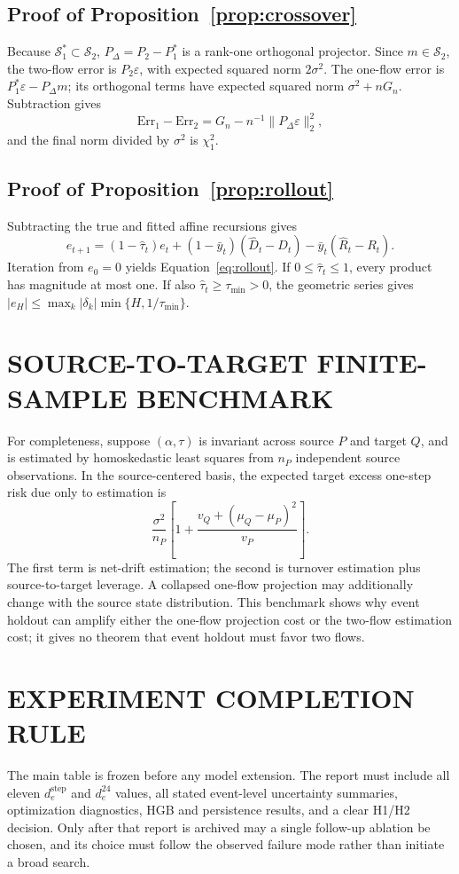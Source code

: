 \documentclass[twoside]{article}
\newcommand{\cS}{\mathcal{S}}
\theoremstyle{plain}
\theoremstyle{definition}
\theoremstyle{remark}
\begin{document}
\subsection{Proof of Proposition~\ref{prop:crossover}}
Because \(\cS_1^*\subset\cS_2\),
\(P_\Delta=P_2-P_1^*\) is a rank-one orthogonal projector. Since
\(m\in\cS_2\), the two-flow error is \(P_2\varepsilon\), with expected
squared norm \(2\sigma^2\). The one-flow error is
\(P_1^*\varepsilon-P_\Delta m\); its orthogonal terms have expected squared
norm \(\sigma^2+nG_n\). Subtraction gives
\[
\mathrm{Err}_1-\mathrm{Err}_2
=G_n-n^{-1}\|P_\Delta\varepsilon\|_2^2,
\]
and the final norm divided by \(\sigma^2\) is \(\chi_1^2\).

\subsection{Proof of Proposition~\ref{prop:rollout}}
Subtracting the true and fitted affine recursions gives
\[
e_{t+1}=(1-\widehat\tau_t)e_t+
(1-\bar y_t)(\widehat D_t-D_t)-
\bar y_t(\widehat R_t-R_t).
\]
Iteration from \(e_0=0\) yields Equation~\eqref{eq:rollout}. If
\(0\le\widehat\tau_t\le1\), every product has magnitude at most one. If also
\(\widehat\tau_t\ge\tau_{\min}>0\), the geometric series gives
\(|e_H|\le\max_k|\delta_k|\min\{H,1/\tau_{\min}\}\).

\section{SOURCE-TO-TARGET FINITE-SAMPLE BENCHMARK}

For completeness, suppose \((\alpha,\tau)\) is invariant across source
\(P\) and target \(Q\), and is estimated by homoskedastic least squares from
\(n_P\) independent source observations. In the source-centered basis, the
expected target excess one-step risk due only to estimation is
\begin{equation}
\frac{\sigma^2}{n_P}
\left[1+\frac{v_Q+(\mu_Q-\mu_P)^2}{v_P}\right].
\label{eq:transfercost}
\end{equation}
The first term is net-drift estimation; the second is turnover estimation plus
source-to-target leverage. A collapsed one-flow projection may additionally
change with the source state distribution. This benchmark shows why event
holdout can amplify either the one-flow projection cost or the two-flow
estimation cost; it gives no theorem that event holdout must favor two flows.

\section{EXPERIMENT COMPLETION RULE}

The main table is frozen before any model extension. The report must include all
eleven \(d_e^{\mathrm{step}}\) and \(d_e^{24}\) values, all stated event-level
uncertainty summaries, optimization diagnostics, HGB and persistence results,
and a clear H1/H2 decision. Only after that report is archived may a single
follow-up ablation be chosen, and its choice must follow the observed failure
mode rather than initiate a broad search.
\end{document}
